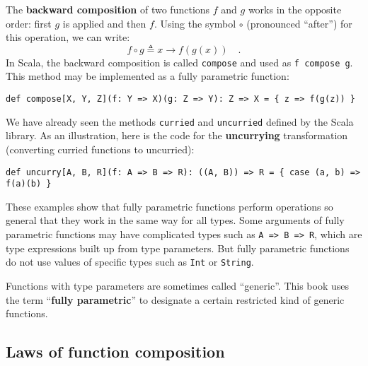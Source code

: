 The \textbf{backward composition} of
two functions $f$ and $g$ works in the opposite order: first $g$
is applied and then $f$. Using the symbol $\circ$ (pronounced \textsf{``}after\textsf{''})
for this operation, we can write:
\begin{equation}
f\circ g\triangleq x\rightarrow f(g(x))\quad.\label{eq:def-of-backward-composition}
\end{equation}
In Scala, the backward composition is called \lstinline!compose!
and used as \lstinline!f compose g!. This method may be implemented
as a fully parametric function:
\begin{lstlisting}
def compose[X, Y, Z](f: Y => X)(g: Z => Y): Z => X = { z => f(g(z)) }
\end{lstlisting}

We have already seen the methods \lstinline!curried! and \lstinline!uncurried!
defined by the Scala library. As an illustration, here is the code
for the \textbf{uncurrying} transformation (converting
curried functions to uncurried):
\begin{lstlisting}
def uncurry[A, B, R](f: A => B => R): ((A, B)) => R = { case (a, b) => f(a)(b) }
\end{lstlisting}

These examples show that fully parametric functions perform operations
so general that they work in the same way for all types. Some arguments
of fully parametric functions may have complicated types such as \lstinline!A => B => R!,
which are type expressions built up from type parameters. But fully
parametric functions do not use values of specific types such as \lstinline!Int!
or \lstinline!String!.

Functions with type parameters are sometimes called \textsf{``}generic\textsf{''}.
This book uses the term \textsf{``}\textbf{fully
parametric}\textsf{''} to designate a certain restricted kind of generic functions.

\subsection{Laws of function composition\label{subsec:Laws-of-function-composition}}


